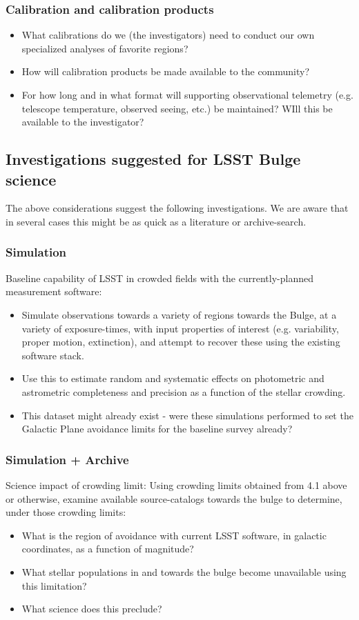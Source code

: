 \subsubsection{Calibration and calibration products}
\begin{itemize}
\item What calibrations do we (the investigators) need to conduct our own specialized analyses of favorite 
regions? 
\item How will calibration products be made available to the community? 
\item{For how long and in what format will supporting observational telemetry (e.g. telescope temperature, 
observed seeing, etc.) be maintained? WIll this be available to the investigator? }
\end{itemize}

\subsection{Investigations suggested for LSST Bulge science}
The above considerations suggest the following investigations. We are aware that in several cases this might be as quick as a literature or archive-search. 
\subsubsection{Simulation}
Baseline capability of LSST in crowded fields with the currently-planned measurement software: 
\begin{itemize}
\item{Simulate observations towards a variety of regions towards the Bulge, at a variety of exposure-times, 
with input properties of interest (e.g. variability, proper motion, extinction), and attempt to recover these using the existing software stack. }
\item{Use this to estimate random and systematic effects on photometric and astrometric completeness and precision as a function of the stellar crowding. }
\item{This dataset might already exist - were these simulations performed to set the Galactic Plane avoidance limits for the baseline survey already? }
\end{itemize}

\subsubsection{Simulation + Archive}
Science impact of crowding limit: Using crowding limits obtained from 4.1 above or otherwise, examine available source-catalogs towards the bulge to determine, under those crowding limits: 
\begin{itemize}
\item What is the region of avoidance with current LSST software, in galactic coordinates, as a function of magnitude? 
\item What stellar populations in and towards the bulge become unavailable using this limitation? 
\item What science does this preclude? 
\end{itemize}


